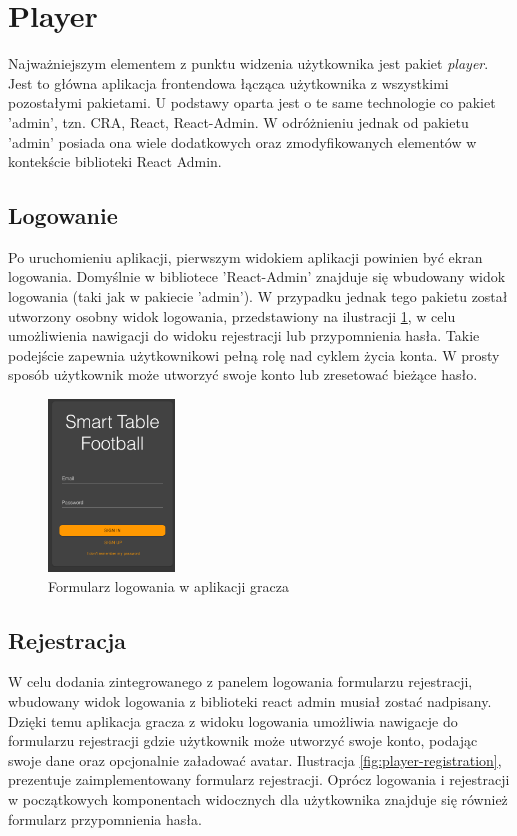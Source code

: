 \section{Player}
Najważniejszym elementem z punktu widzenia użytkownika jest pakiet \textit{player}. Jest to główna aplikacja frontendowa łącząca użytkownika z wszystkimi pozostałymi pakietami. U podstawy oparta jest o te same technologie co pakiet 'admin', tzn. CRA, React, React-Admin. W odróżnieniu jednak od pakietu 'admin' posiada ona wiele dodatkowych oraz zmodyfikowanych elementów w kontekście biblioteki React Admin.

\subsection{Logowanie}
Po uruchomieniu aplikacji, pierwszym widokiem aplikacji powinien być ekran logowania. Domyślnie w bibliotece 'React-Admin' znajduje się wbudowany widok logowania (taki jak w pakiecie 'admin'). W przypadku jednak tego pakietu został utworzony osobny widok logowania, przedstawiony na ilustracji \ref{fig:player-login}, w celu umożliwienia nawigacji do widoku rejestracji lub przypomnienia hasła. Takie podejście zapewnia użytkownikowi pełną rolę nad cyklem życia konta. W prosty sposób użytkownik może utworzyć swoje konto lub zresetować bieżące hasło.

\begin{figure}[h!]
  \centering
    \includegraphics[width=0.3\textwidth]{images/player/login.png}
  \caption{Formularz logowania w aplikacji gracza}
  \label{fig:player-login}
\end{figure}

\subsection{Rejestracja}

W celu dodania zintegrowanego z panelem logowania formularzu rejestracji, wbudowany widok logowania z biblioteki react admin musiał zostać nadpisany. Dzięki temu aplikacja gracza z widoku logowania umożliwia nawigacje do formularzu rejestracji gdzie użytkownik może utworzyć swoje konto, podając swoje dane oraz opcjonalnie załadować avatar. Ilustracja \ref{fig:player-registration}, prezentuje zaimplementowany formularz rejestracji. Oprócz logowania i rejestracji w początkowych komponentach widocznych dla użytkownika znajduje się również formularz przypomnienia hasła.

